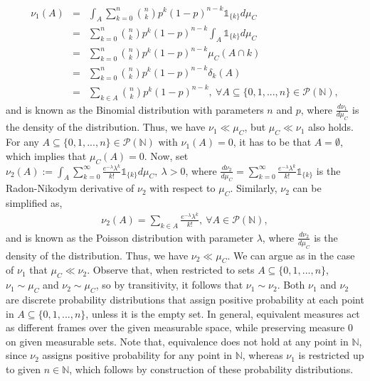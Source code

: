 \documentclass{article}
\begin{document}
\begin{eqnarray}
\nonumber
\nu_1(A) &=& \int_A \sum_{k=0}^{n}\binom{n}{k}p^k(1-p)^{n-k}\mathds{1}_{\{k\}} d\mu_C \\
\nonumber
&=& \sum_{k=0}^{n}\binom{n}{k}p^k(1-p)^{n-k}\int_A \mathds{1}_{\{k\}} d\mu_C\\
\nonumber
&=& \sum_{k=0}^{n}\binom{n}{k}p^k(1-p)^{n-k}\mu_C(A \cap k)\\
\nonumber
&=& \sum_{k=0}^{n}\binom{n}{k}p^k(1-p)^{n-k}\delta_k(A)\\
\nonumber
&=& \sum_{k \in A}\binom{n}{k}p^k(1-p)^{n-k}, \ \forall A \subseteq \{0,1,...,n\} \in \mathcal{P}(\mathbb{N}),
\end{eqnarray}
and is known as the Binomial distribution with parameters $n$ and $p$, where $\frac{d\nu_1}{d\mu_C}$ is the density of the distribution. Thus, we have $\nu_1\ll\mu_C$, but $\mu_C\ll\nu_1$ also holds. For any $A\subseteq \{0,1,...,n\}\in\mathcal{P}(\mathbb{N})$ with $\nu_1(A) = 0$,  it has to be that $A = \emptyset$, which implies that $\mu_C(A) = 0$. Now, set $\nu_2(A) := \int_A \sum_{k=0}^{\infty}\frac{e^{-\lambda}\lambda^k}{k!}\mathds{1}_{\{k\}} d\mu_C, \ \lambda > 0$, where $\frac{d\nu_2}{d\mu_C} = \sum_{k=0}^{\infty}\frac{e^{-\lambda}\lambda^k}{k!}\mathds{1}_{\{k\}}$ is the Radon-Nikodym derivative of $\nu_2$ with respect to $\mu_C$. Similarly, $\nu_2$ can be simplified as,
\begin{eqnarray}
\nonumber
\nu_2(A) = \sum_{k \in A}\frac{e^{-\lambda}\lambda^k}{k!}, \ \forall A \in \mathcal{P}(\mathbb{N}),
\end{eqnarray}
and is known as the Poisson distribution with parameter $\lambda$, where $\frac{d\nu_2}{d\mu_C}$ is the density of the distribution. Thus, we have $\nu_2\ll\mu_C$. We can argue as in the case of $\nu_1$ that $\mu_C\ll\nu_2$. Observe that, when restricted to sets $A \subseteq \{0,1,...,n\}$, $\nu_1 \sim \mu_C$ and $\nu_2 \sim \mu_C$, so by transitivity, it follows that $\nu_1 \sim \nu_2$. Both $\nu_1$ and $\nu_2$ are discrete probability distributions that assign positive probability at each point in $A \subseteq \{0,1,...,n\}$, unless it is the empty set. In general, equivalent measures act as different frames over the given measurable space, while preserving measure $0$ on given measurable sets. Note that, equivalence does not hold at any point in $\mathbb{N}$, since $\nu_2$ assigns positive probability for any point in $\mathbb{N}$, whereas $\nu_1$ is restricted up to given $n\in\mathbb{N}$, which follows by construction of these probability distributions.\\\\
\end{document}
